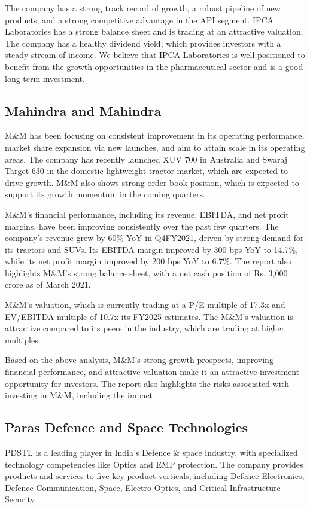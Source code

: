 The company has a strong track record of growth, a robust pipeline of new products, and a strong competitive advantage in the API segment. IPCA Laboratories has a strong balance sheet and is trading at an attractive valuation. The company has a healthy dividend yield, which provides investors with a steady stream of income. We believe that IPCA Laboratories is well-positioned to benefit from the growth opportunities in the pharmaceutical sector and is a good long-term investment.

    \subsection{Mahindra and Mahindra} M\&M has been focusing on consistent improvement in its operating performance, market share expansion via new launches, and aim to attain scale in its operating areas. The company has recently launched XUV 700 in Australia and Swaraj Target 630 in the domestic lightweight tractor market, which are expected to drive growth. M\&M also shows strong order book position, which is expected to support its growth momentum in the coming quarters.

M\&M's financial performance, including its revenue, EBITDA, and net profit margins, have been improving consistently over the past few quarters. The company's revenue grew by 60\% YoY in Q4FY2021, driven by strong demand for its tractors and SUVs. Its EBITDA margin improved by 300 bps YoY to 14.7\%, while its net profit margin improved by 200 bps YoY to 6.7\%. The report also highlights M\&M's strong balance sheet, with a net cash position of Rs. 3,000 crore as of March 2021.

M\&M's valuation, which is currently trading at a P/E multiple of 17.3x and EV/EBITDA multiple of 10.7x its FY2025 estimates. The M\&M's valuation is attractive compared to its peers in the industry, which are trading at higher multiples. 

Based on the above analysis, M\&M's strong growth prospects, improving financial performance, and attractive valuation make it an attractive investment opportunity for investors. The report also highlights the risks associated with investing in M\&M, including the impact


    \subsection{Paras Defence and Space Technologies}

PDSTL is a leading player in India's Defence \& space industry, with specialized technology competencies like Optics and EMP protection. The company provides products and services to five key product verticals, including Defence Electronics, Defence Communication, Space, Electro-Optics, and Critical Infrastructure Security.

